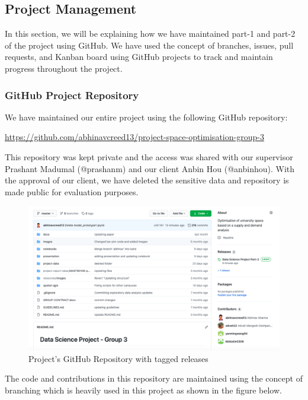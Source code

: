 \subsection{Project Management}

In this section, we will be explaining how we have maintained part-1 and part-2 of the project using GitHub. We have used the concept of branches, issues, pull requests, and Kanban board using GitHub projects to track and maintain progress throughout the project.

\subsubsection{GitHub Project Repository}

We have maintained our entire project using the following GitHub repository:

\url{https://github.com/abhinavcreed13/project-space-optimisation-group-3}

This repository was kept private and the access was shared with our supervisor Prashant Madumal (@prashanm) and our client Anbin Hou (@anbinhou). With the approval of our client, we have deleted the sensitive data and repository is made public for evaluation purposes.

\begin{figure}[H]
\centering
\includegraphics[width=16cm]{resources/images/github/github1.png}
\caption{Project's GitHub Repository with tagged releases}
\label{fig:github1}
\end{figure}

The code and contributions in this repository are maintained using the concept of branching which is heavily used in this project as shown in the figure below.

